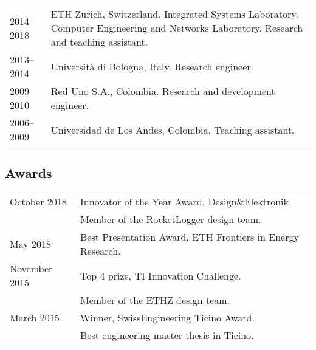 \begin{footnotesize}
\begin{tabular}{@{}P{2.25cm}P{10cm}}
2014--2018 &
ETH Zurich, Switzerland. \linebreak
Integrated Systems Laboratory. \linebreak
Computer Engineering and Networks Laboratory. \linebreak
Research and teaching assistant. \\
2013--2014 & Universit\`a di Bologna, Italy. \linebreak
Research engineer. \\
2009--2010 & Red Uno S.A., Colombia. \linebreak
Research and development engineer. \\
2006--2009 & Universidad de Los Andes, Colombia. \linebreak
Teaching assistant.\\
\end{tabular}

\newpage

\subsection*{Awards}

\begin{tabular}{@{}P{2.25cm}P{10cm}}
October 2018 & Innovator of the Year Award, Design\&Elektronik. \\ 
 & Member of the RocketLogger design team. \\
May 2018 & Best Presentation Award, ETH Frontiers in Energy Research. \\
November 2015 &  Top 4 prize, TI Innovation Challenge. \\
 & Member of the ETHZ design team. \\
March 2015 &  Winner, SwissEngineering Ticino Award. \\
 & Best engineering master thesis in Ticino.
\end{tabular}

\end{footnotesize}
